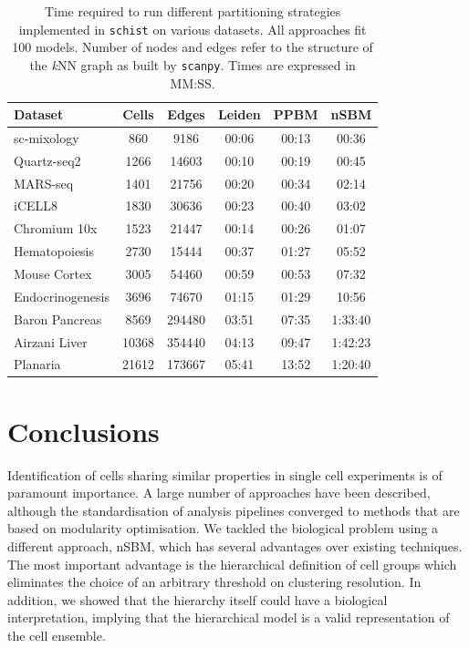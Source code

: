 \documentclass[10pt]{article}
\begin{document}
\begin{table}[h!]
\centering
 \begin{tabular}{|| l c c | c c c ||}
 \hline
 \textbf{Dataset} & \textbf{Cells} & \textbf{Edges} & \textbf{Leiden} & \textbf{PPBM} & \textbf{nSBM} \\ [0.5ex] 
 \hline\hline
 sc-mixology \cite{Tian_2019} & 860 & 9186 & 00:06 & 00:13 & 00:36 \\ 
 \hline
 Quartz-seq2 \cite{mereu_2020} & 1266 & 14603 & 00:10 & 00:19 & 00:45 \\
 \hline
 MARS-seq \cite{mereu_2020} & 1401 & 21756 & 00:20 & 00:34 & 02:14 \\
 \hline
 iCELL8 \cite{mereu_2020} & 1830 & 30636 & 00:23 & 00:40 & 03:02 \\
 \hline
 Chromium 10x \cite{mereu_2020} & 1523 & 21447 & 00:14 & 00:26 & 01:07 \\ 
 \hline
 Hematopoiesis \cite{paul_2015} & 2730 & 15444 & 00:37 & 01:27 & 05:52\\ 
 \hline
 Mouse Cortex \cite{Zeisel_2015} & 3005 & 54460 & 00:59 & 00:53 & 07:32 \\
 \hline
 Endocrinogenesis \cite{Bastidas_Ponce_2019} & 3696 & 74670 & 01:15 & 01:29 & 10:56 \\
 \hline
 Baron Pancreas \cite{Baron_2016} & 8569 & 294480 & 03:51 & 07:35 & 1:33:40 \\
 \hline
 Airzani Liver \cite{Aizarani_2019} & 10368 & 354440 & 04:13 & 09:47 & 1:42:23 \\
 \hline
 Planaria \cite{plass_2018} & 21612 & 173667 & 05:41 & 13:52 & 1:20:40 \\
 \hline
\end{tabular}
\caption{Time required to run different partitioning strategies implemented in \texttt{schist} on various datasets. All approaches fit 100 models. Number of nodes and edges refer to the structure of the \emph{k}NN graph as built by \texttt{scanpy}. Times are expressed in MM:SS. }
\label{Table_runtime}
\end{table}

\section*{Conclusions}

Identification of cells sharing similar properties in single cell experiments is of paramount importance. A large number of approaches have been described, although the standardisation of analysis pipelines converged to methods that are based on modularity optimisation. We tackled the biological problem using a different approach, nSBM, which has several advantages over existing techniques. The most important advantage is the hierarchical definition of cell groups which eliminates the choice of an arbitrary threshold on clustering resolution. In addition, we showed that the hierarchy itself could have a biological interpretation, implying that the hierarchical model is a valid representation of the cell ensemble. 
\end{document}
